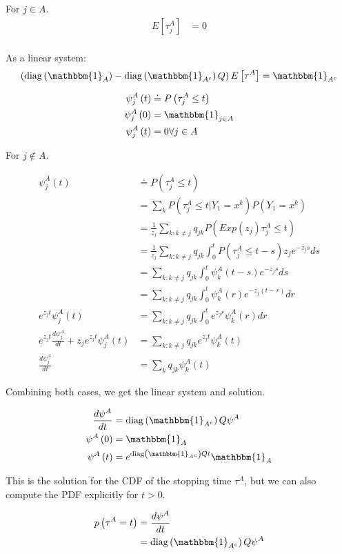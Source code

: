 For $j \in A$.
\begin{align}
	E\left[\tau^{A}_{j}\right] &= 0 \\
\end{align}

As a linear system:
\begin{align}
	\left(\diag\left(\mathbbm{1}_A\right) - \diag\left(\mathbbm{1}_{A^c}\right)Q\right)E\left[\tau^{A}\right] =\mathbbm{1}_{A^c}\\
\end{align}


\begin{align}
\psi_j^A\left(t\right) &\doteq P\left(\tau^A_j \leq t\right) \\
\psi_j^A\left(0\right) &= \mathbbm{1}_{j\in A} \\
\psi_j^A\left(t\right) &= 0 \forall j \in A \\                       
\end{align}

For $j \not\in A$.

\begin{align}
\psi_j^A\left(t\right) &\doteq P\left(\tau^A_j \leq t\right) \\
                       &= \sum_k P\left(\tau^A_j \leq t | Y_1 = x^k\right) P\left(Y_1 = x^k\right) \\ 
                       &= \frac{1}{z_j}\sum_{k: k \neq j} q_{jk} P\left(Exp\left(z_j\right)\tau^A_j \leq t\right)  \\
                       &= \frac{1}{z_j}\sum_{k: k \neq j} q_{jk} \int^t_0 P\left(\tau^A_j \leq t - s\right) z_j e^{-z_j s} ds  \\
                       &= \sum_{k: k \neq j} q_{jk} \int^t_0\psi^A_k\left(t-s\right)e^{-z_j s} ds  \\
                       &= \sum_{k: k \neq j} q_{jk} \int^t_0\psi^A_k\left(r\right)e^{-z_j\left(t-r\right)} dr  \\
e^{z_jt}\psi^A_j\left(t\right) &= \sum_{k: k \neq j} q_{jk} \int^t_0 e^{z_jr}\psi^A_k\left(r\right) dr  \\
e^{z_jt}\frac{d\psi^A_j}{dt} + z_j e^{z_j t} \psi^A_j\left(t\right) &= \sum_{k: k \neq j} q_{jk} e^{z_jt}\psi^A_k\left(t\right)  \\
\frac{d\psi^A_j}{dt} &= \sum_{k} q_{jk} \psi^A_k\left(t\right) 
\end{align}

Combining both cases, we get the linear system and solution.

\begin{align}
        \frac{d\psi^A}{dt} &= \diag\left(\mathbbm{1}_{A^c}\right)Q\psi^A \\
        \psi^A\left(0\right) &= \mathbbm{1}_{A} \\
        \psi^A\left(t\right) &= e^{\diag\left(\mathbbm{1}_{A^c}\right)Qt} \mathbbm{1}_{A} \\ 
\end{align}

This is the solution for the CDF of the stopping time $\tau^A$, but we can also compute the PDF explicitly for $t > 0$.

\begin{align}
        p\left(\tau^A = t\right) &= \frac{d\psi^A}{dt} \\
        &= \diag\left(\mathbbm{1}_{A^c}\right)Q\psi^A
\end{align} 


